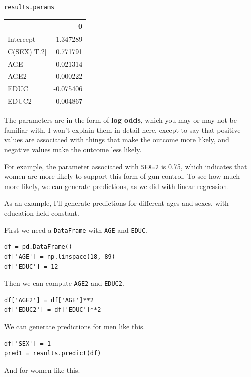 \begin{lstlisting}[]
results.params
\end{lstlisting}

\begin{tabular}{lr}
\midrule
{} &         0 \\
\midrule
Intercept   &  1.347289 \\
C(SEX)[T.2] &  0.771791 \\
AGE         & -0.021314 \\
AGE2        &  0.000222 \\
EDUC        & -0.075406 \\
EDUC2       &  0.004867 \\
\midrule
\end{tabular}

The parameters are in the form of \textbf{log odds}, which you may or
may not be familiar with. I won't explain them in detail here, except to
say that positive values are associated with things that make the
outcome more likely, and negative values make the outcome less likely.

For example, the parameter associated with
\passthrough{\lstinline!SEX=2!} is 0.75, which indicates that women are
more likely to support this form of gun control. To see how much more
likely, we can generate predictions, as we did with linear regression.

As an example, I'll generate predictions for different ages and sexes,
with education held constant.

First we need a \passthrough{\lstinline!DataFrame!} with
\passthrough{\lstinline!AGE!} and \passthrough{\lstinline!EDUC!}.

\begin{lstlisting}[]
df = pd.DataFrame()
df['AGE'] = np.linspace(18, 89)
df['EDUC'] = 12
\end{lstlisting}

Then we can compute \passthrough{\lstinline!AGE2!} and
\passthrough{\lstinline!EDUC2!}.

\begin{lstlisting}[]
df['AGE2'] = df['AGE']**2
df['EDUC2'] = df['EDUC']**2
\end{lstlisting}

We can generate predictions for men like this.

\begin{lstlisting}[]
df['SEX'] = 1
pred1 = results.predict(df)
\end{lstlisting}

And for women like this.

